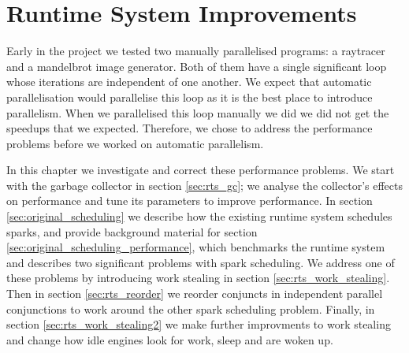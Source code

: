 
\chapter{Runtime System Improvements}
\label{chap:rts}


Early in the project
we tested two manually parallelised programs:
a raytracer and a mandelbrot image generator.
Both of them have a single significant loop
whose iterations are independent of one another.
We expect that automatic parallelisation would parallelise this loop
as it is the best place to introduce parallelism.
When we parallelised this loop manually we did
we did not get the speedups that we expected.
Therefore,
we chose to address the performance problems
before we worked on automatic parallelism.

In this chapter we investigate and correct these performance problems.
We start with the garbage collector in section \ref{sec:rts_gc};
we analyse the collector's effects on performance and tune its parameters
to improve performance.
In section \ref{sec:original_scheduling} we describe how the existing runtime
system schedules sparks,
and provide background material for
section \ref{sec:original_scheduling_performance},
which benchmarks the runtime system and describes two significant problems with
spark scheduling.
We address one of these problems by introducing work stealing in section
\ref{sec:rts_work_stealing}.
Then in section \ref{sec:rts_reorder} we reorder conjuncts in independent
parallel conjunctions to work around the other spark scheduling problem.
Finally, in section \ref{sec:rts_work_stealing2} we make further improvments to
work stealing and change how idle engines look for work, sleep and are
woken up.






%


%

